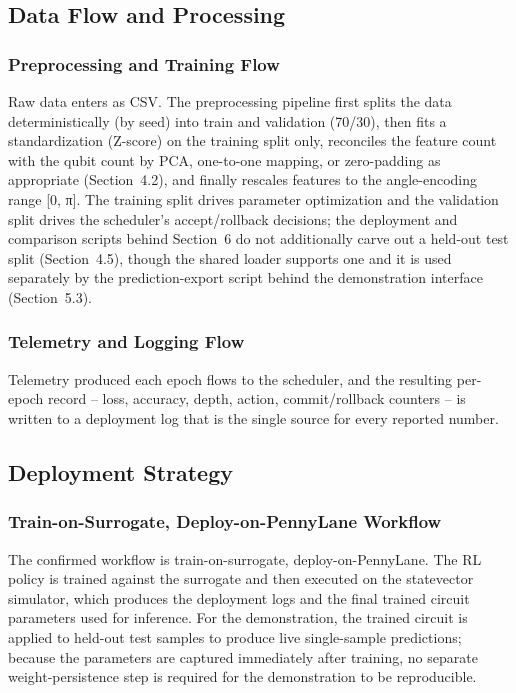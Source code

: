 \subsection{Data Flow and Processing}

\subsubsection{Preprocessing and Training Flow}
Raw data enters as CSV. The preprocessing pipeline first splits the data deterministically (by seed) into train and validation (70/30), then fits a standardization (Z-score) on the training split only, reconciles the feature count with the qubit count by PCA, one-to-one mapping, or zero-padding as appropriate (Section~4.2), and finally rescales features to the angle-encoding range [0, π]. The training split drives parameter optimization and the validation split drives the scheduler's accept/rollback decisions; the deployment and comparison scripts behind Section~6 do not additionally carve out a held-out test split (Section~4.5), though the shared loader supports one and it is used separately by the prediction-export script behind the demonstration interface (Section~5.3).

\subsubsection{Telemetry and Logging Flow}
Telemetry produced each epoch flows to the scheduler, and the resulting per-epoch record -- loss, accuracy, depth, action, commit/rollback counters -- is written to a deployment log that is the single source for every reported number.

\subsection{Deployment Strategy}

\subsubsection{Train-on-Surrogate, Deploy-on-PennyLane Workflow}
The confirmed workflow is train-on-surrogate, deploy-on-PennyLane. The RL policy is trained against the surrogate and then executed on the statevector simulator, which produces the deployment logs and the final trained circuit parameters used for inference. For the demonstration, the trained circuit is applied to held-out test samples to produce live single-sample predictions; because the parameters are captured immediately after training, no separate weight-persistence step is required for the demonstration to be reproducible.

